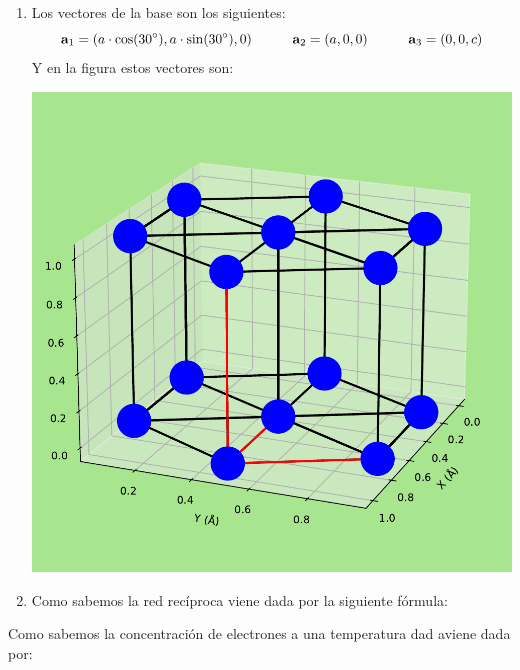 \begin{solucion}
	\begin{enumerate}[label=\alph*)]
		\item Los vectores de la base son los siguientes:
		\begin{equation*}
			\mathbf{a}_1 = (a\cdot \cos(30^\circ),a\cdot \sin(30^\circ),0) \quad \quad \quad 
			\mathbf{a}_2 = (a,0,0) \quad \quad \quad
			\mathbf{a}_3 = (0,0,c)
		\end{equation*}
		Y en la figura estos vectores son:
		
		\begin{center}
			\includegraphics[scale=0.5]{Imagenes/2023-Enero-03.pdf}
		\end{center}
		
		\item Como sabemos la red recíproca viene dada por la siguiente fórmula: 
		
		
	\end{enumerate}
\end{solucion}

\begin{solucion}
	Como sabemos la concentración de electrones a una temperatura dad aviene dada por:
\end{solucion}	


\newpage


